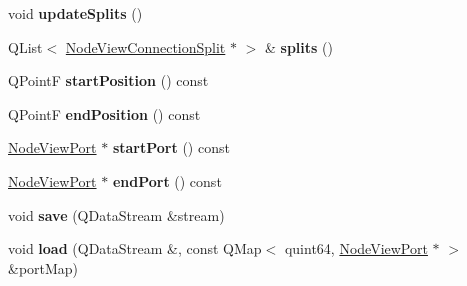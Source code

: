 \begin{DoxyCompactItemize}
void {\bfseries update\+Splits} ()
\item 
\mbox{\label{classrev_1_1_view_1_1_node_view_connection_af5156ddf6c8fa81a93086ec9054d164f}} 
Q\+List$<$ \mbox{\hyperlink{classrev_1_1_view_1_1_node_view_connection_split}{Node\+View\+Connection\+Split}} $\ast$ $>$ \& {\bfseries splits} ()
\item 
\mbox{\label{classrev_1_1_view_1_1_node_view_connection_ac74d6ccdf3ef77855dc31340b110c658}} 
Q\+PointF {\bfseries start\+Position} () const
\item 
\mbox{\label{classrev_1_1_view_1_1_node_view_connection_a5177cf4cc7023da92476de89f722ad69}} 
Q\+PointF {\bfseries end\+Position} () const
\item 
\mbox{\label{classrev_1_1_view_1_1_node_view_connection_aecb45745114b972ce9e5a3e3f2c6c786}} 
\mbox{\hyperlink{classrev_1_1_view_1_1_node_view_port}{Node\+View\+Port}} $\ast$ {\bfseries start\+Port} () const
\item 
\mbox{\label{classrev_1_1_view_1_1_node_view_connection_a7cf3f4ac7a4c4979c221d3601f1a22b2}} 
\mbox{\hyperlink{classrev_1_1_view_1_1_node_view_port}{Node\+View\+Port}} $\ast$ {\bfseries end\+Port} () const
\item 
\mbox{\label{classrev_1_1_view_1_1_node_view_connection_a9dc2337347e428e0133044b3fa1eccb1}} 
void {\bfseries save} (Q\+Data\+Stream \&stream)
\item 
\mbox{\label{classrev_1_1_view_1_1_node_view_connection_aaa11eaae84ea4240b655a4332ee2d89b}} 
void {\bfseries load} (Q\+Data\+Stream \&, const Q\+Map$<$ quint64, \mbox{\hyperlink{classrev_1_1_view_1_1_node_view_port}{Node\+View\+Port}} $\ast$ $>$ \&port\+Map)
\end{DoxyCompactItemize}
